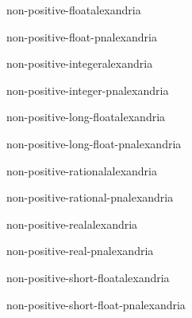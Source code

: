 \begin{type}{non-positive-float}{}{alexandria}{}
  
\end{type}

\begin{function}{non-positive-float-p}{n}{alexandria}{}
  
\end{function}

\begin{type}{non-positive-integer}{}{alexandria}{}
  
\end{type}

\begin{function}{non-positive-integer-p}{n}{alexandria}{}
  
\end{function}

\begin{type}{non-positive-long-float}{}{alexandria}{}
  
\end{type}

\begin{function}{non-positive-long-float-p}{n}{alexandria}{}
  
\end{function}

\begin{type}{non-positive-rational}{}{alexandria}{}
  
\end{type}

\begin{function}{non-positive-rational-p}{n}{alexandria}{}
  
\end{function}

\begin{type}{non-positive-real}{}{alexandria}{}
  
\end{type}

\begin{function}{non-positive-real-p}{n}{alexandria}{}
  
\end{function}

\begin{type}{non-positive-short-float}{}{alexandria}{}
  
\end{type}

\begin{function}{non-positive-short-float-p}{n}{alexandria}{}
  
\end{function}

